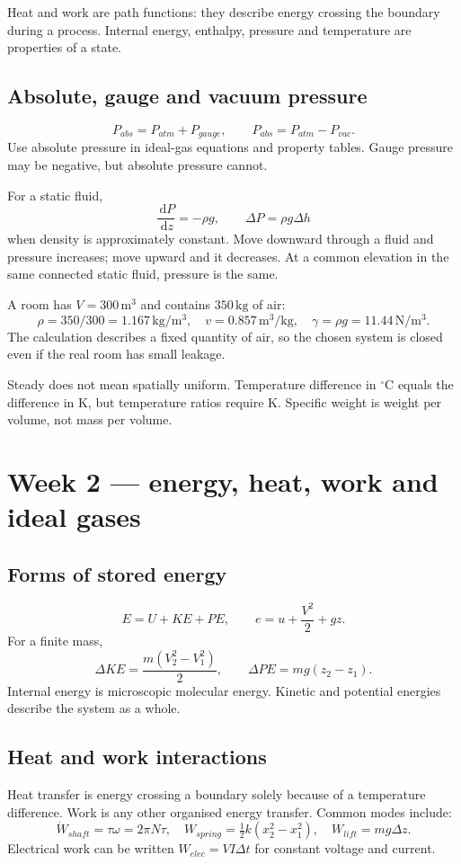 \documentclass[10pt,a4paper]{article}
\newcommand{\dd}{\,\mathrm{d}}\newcommand{\unit}[1]{\,\mathrm{#1}}
\begin{document}
Heat and work are path functions: they describe energy crossing the boundary during a process. Internal energy, enthalpy, pressure and temperature are properties of a state.

\subsection{Absolute, gauge and vacuum pressure}
\[
P_{abs}=P_{atm}+P_{gauge},\qquad P_{abs}=P_{atm}-P_{vac}.
\]
Use absolute pressure in ideal-gas equations and property tables. Gauge pressure may be negative, but absolute pressure cannot.

For a static fluid,
\[
\frac{\dd P}{\dd z}=-\rho g,\qquad \Delta P=\rho g\Delta h
\]
when density is approximately constant. Move downward through a fluid and pressure increases; move upward and it decreases. At a common elevation in the same connected static fluid, pressure is the same.

\begin{example}
A room has $V=300\unit{m^3}$ and contains $350\unit{kg}$ of air:
\[
\rho=350/300=1.167\unit{kg/m^3},\quad v=0.857\unit{m^3/kg},\quad \gamma=\rho g=11.44\unit{N/m^3}.
\]
The calculation describes a fixed quantity of air, so the chosen system is closed even if the real room has small leakage.
\end{example}

\begin{trap}
Steady does not mean spatially uniform. Temperature difference in $^\circ$C equals the difference in K, but temperature ratios require K. Specific weight is weight per volume, not mass per volume.
\end{trap}

\section{Week 2 --- energy, heat, work and ideal gases}
\subsection{Forms of stored energy}
\[
E=U+KE+PE,
\qquad e=u+\frac{V^2}{2}+gz.
\]
For a finite mass,
\[
\Delta KE=\frac{m(V_2^2-V_1^2)}{2},\qquad \Delta PE=mg(z_2-z_1).
\]
Internal energy is microscopic molecular energy. Kinetic and potential energies describe the system as a whole.

\subsection{Heat and work interactions}
Heat transfer is energy crossing a boundary solely because of a temperature difference. Work is any other organised energy transfer. Common modes include:
\[
\dot W_{shaft}=\tau\omega=2\pi N\tau,
\quad W_{spring}=\tfrac12k(x_2^2-x_1^2),
\quad W_{lift}=mg\Delta z.
\]
Electrical work can be written $W_{elec}=VI\Delta t$ for constant voltage and current.
\end{document}
